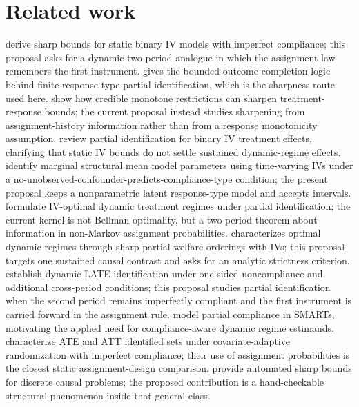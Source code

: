 \documentclass[11pt]{article}
\theoremstyle{definition}
\theoremstyle{plain}
\theoremstyle{remark}
\begin{document}
\section{Related work}
\citet{BalkePearl1997} derive sharp bounds for static binary IV models with imperfect compliance; this proposal asks for a dynamic two-period analogue in which the assignment law remembers the first instrument.  \citet{Manski1990} gives the bounded-outcome completion logic behind finite response-type partial identification, which is the sharpness route used here.  \citet{ManskiPepper2000} show how credible monotone restrictions can sharpen treatment-response bounds; the current proposal instead studies sharpening from assignment-history information rather than from a response monotonicity assumption.  \citet{SwansonHernanMillerRobinsRichardson2018} review partial identification for binary IV treatment effects, clarifying that static IV bounds do not settle sustained dynamic-regime effects.  \citet{MichaelCuiLorchTchetgen2024} identify marginal structural mean model parameters using time-varying IVs under a no-unobserved-confounder-predicts-compliance-type condition; the present proposal keeps a nonparametric latent response-type model and accepts intervals.  \citet{ChenZhang2023} formulate IV-optimal dynamic treatment regimes under partial identification; the current kernel is not Bellman optimality, but a two-period theorem about information in non-Markov assignment probabilities.  \citet{Han2023} characterizes optimal dynamic regimes through sharp partial welfare orderings with IVs; this proposal targets one sustained causal contrast and asks for an analytic strictness criterion.  \citet{SojitraSyrgkanis2024} establish dynamic LATE identification under one-sided noncompliance and additional cross-period conditions; this proposal studies partial identification when the second period remains imperfectly compliant and the first instrument is carried forward in the assignment rule.  \citet{ArtmanBhattacharyaErtefaieLynchMcKayJohnson2024} model partial compliance in SMARTs, motivating the applied need for compliance-aware dynamic regime estimands.  \citet{BugniGaoObradovicVelez2024} characterize ATE and ATT identified sets under covariate-adaptive randomization with imperfect compliance; their use of assignment probabilities is the closest static assignment-design comparison.  \citet{DuarteFinkelsteinKnoxMummoloShpitser2024} provide automated sharp bounds for discrete causal problems; the proposed contribution is a hand-checkable structural phenomenon inside that general class.
\end{document}
